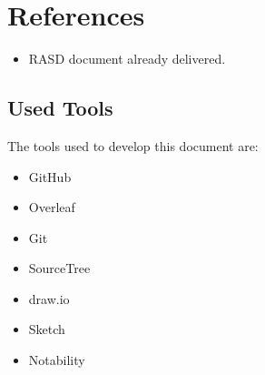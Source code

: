 \chapter{References}
\begin{itemize}
    \item RASD document already delivered.
\end{itemize}

\section{Used Tools}
The tools used to develop this document are:
\begin{itemize}
    \item GitHub
    \item Overleaf
    \item Git
    \item SourceTree
    \item draw.io
    \item Sketch
    \item Notability
\end{itemize}